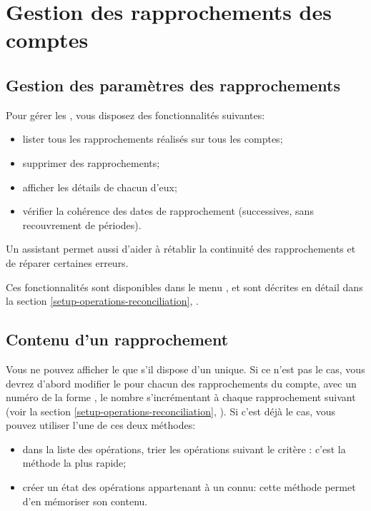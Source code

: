 \section{Gestion des rapprochements des comptes\label{reconciliation-manage}}


\subsection{Gestion des paramètres des rapprochements\label{reconciliation-manage-parameters}}

Pour gérer les , vous disposez des fonctionnalités suivantes:
\begin{itemize}
	\item lister tous les rapprochements réalisés sur tous les comptes;
	\item supprimer des rapprochements;
	\item afficher les détails de chacun d'eux;
	\item vérifier la cohérence des dates de rapprochement (successives, sans recouvrement de périodes).
\end{itemize}

Un assistant permet aussi d'aider à rétablir la continuité des rapprochements et de réparer certaines erreurs.

Ces fonctionnalités sont disponibles dans le menu , et sont décrites en détail dans la section \vref{setup-operations-reconciliation}, .


\subsection{Contenu d'un rapprochement\label{reconciliation-manage-content}}

Vous ne pouvez afficher le  que s'il dispose d'un  unique. Si ce n'est pas le cas, vous devrez d'abord modifier le  pour chacun des rapprochements du compte, avec un numéro de la forme , le nombre s'incrémentant à chaque rapprochement suivant (voir la section \vref{setup-operations-reconciliation}, ). Si c'est déjà le cas, vous pouvez utiliser l'une de ces deux méthodes:
\begin{itemize}
	\item dans la liste des opérations, trier les opérations suivant le critère : c'est la méthode la plus rapide;
	\item créer un état des opérations appartenant à un  connu: cette méthode permet d'en mémoriser son contenu.
\end{itemize}


